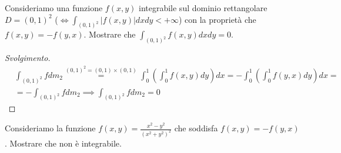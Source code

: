 \begin{example}
	Consideriamo una funzione $f(x, y)$ integrabile sul dominio rettangolare $D=(0,1)^2$ ($\iff \int_{(0,1)^2} |f(x, y)|dxdy < +\infty$) con la proprietà che $f(x,y)=-f(y,x)$. Mostrare che
	$\int_{(0,1)^2} f(x,y)dxdy = 0$.
\end{example}
\begin{proof}[Svolgimento]
\begin{align*}
&\int_{(0,1)^2} fdm_2 \stackrel{(0,1)^2 = (0,1) \times (0,1)}{=} \int_0^1 \left( \int_0^1 f(x, y) dy \right)dx = -\int_0^1 \left( \int_0^1 f(y,x) dy \right) dx = \\
&= - \int_{(0,1)^2} fdm_2 \implies \int_{(0,1)^2} fdm_2 = 0 
\end{align*}
\end{proof}
\begin{example}
	Consideriamo la funzione $f(x, y)=\frac{x^2 - y^2}{(x^2 + y^2)^2}$ che soddisfa $f(x, y) = -f(y,x)$. Mostrare che non è integrabile.
\end{example}
